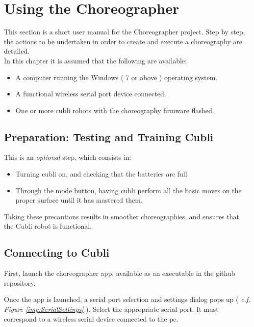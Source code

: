 \chapter{Using the Choreographer}\label{sec:usingthe}

This section is a short user manual for the Choreographer project.
Step by step, the actions to be undertaken in order to create and execute a choreography are detailed.\\

In this chapter it is assumed that the following are available:
\begin{itemize}
\item A computer running the Windows ( 7 or above ) operating system.
\item A functional wireless serial port device connected.
\item One or more cubli robots with the choreography firmware flashed.
\end{itemize}

\section{Preparation: Testing and Training Cubli}

This is an \textit{optional} step, which consists in:

\begin{itemize}
\item[] Turning cubli on, and checking that the batteries are full
\item[] Through the mode button, having cubli perform all the basic moves on the proper surface until it has mastered them.
\end{itemize}

Taking these precautions results in smoother choreographies, and ensures that the Cubli robot is functional.

\section{Connecting to Cubli}

First, launch the choreographer app, available as an executable in the github repository.

Once the app is launched, a serial port selection and settings dialog pops up ( \textit{c.f. Figure \ref{img:SerialSettings}} ). Select the appropriate serial port. It must correspond to a wireless serial device connected to the pc.

